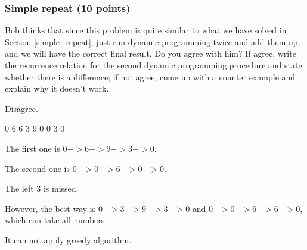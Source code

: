 \documentclass[11pt]{exam}
\begin{document}
\subsubsection{Simple repeat (10 points)}
Bob thinks that since this problem is quite similar to what we have solved in Section \ref{simple_repeat}, just run dynamic programming twice and add them up, and we will have the correct final result. Do you agree with him? If agree, write the recurrence relation for the second dynamic programming procedure and state whether there is a difference; if not agree, come up with a counter example and explain why it doesn't work.
\begin{solution}

    Disagree.

    0 6 6
    3 9 0
    0 3 0

    The first one is $0->6->9->3->0$.

    The second one is $0->0->6->0->0$.

    The left 3 is missed.

    However, the best way is $0->3->9->3->0$ and $0->0->6->6->0$, which can take all numbers.

    It can not apply greedy algorithm.

\end{solution}
\end{document}
